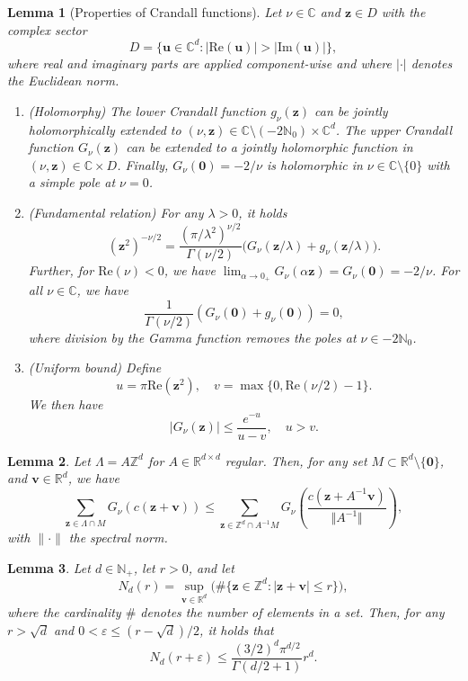 \documentclass[10pt,a4paper]{amsart}
\newtheorem{lemma}{Lemma}
\renewcommand{\Im}[1]{\mathrm{Im}(#1)}
\renewcommand{\Re}[1]{\mathrm{Re}(#1)}
\newcommand{\new}[1]{#1}
\begin{document}
\begin{lemma}[Properties of Crandall functions]
\label{lem:propCrandall}
Let $\nu \in\mathds C$ and $\bm z\in D$ with the complex sector
$$
D=\{\bm u\in\mathds C^d:|\Re{\bm u}|>|\Im{\bm u}|\},
$$
where real and imaginary parts are applied component-wise and where $\vert \bm \cdot \vert$ denotes the Euclidean norm.
\begin{enumerate}
\item (Holomorphy) The lower Crandall function $g_{\nu}(\bm z)$ 
\new{can be jointly holomorphically extended to} 
$(\nu,\bm z)\in\mathds C\setminus(-2\mathds N_0)\times \mathds C^d$. The upper Crandall function $G_{\nu}(\bm z)$ can be extended to a jointly holomorphic function in $(\nu,\bm z)\in \mathds C \times D$. Finally,
$G_{\nu}(\bm 0)=-2/\nu$ is holomorphic in $\nu\in\mathds C\setminus\{0\}$
with a simple pole at $\nu=0$.
\item (Fundamental relation)
For any $\lambda>0$, it holds
\[
( \bm z^2 )^{-\nu/2} = \frac{(\pi/\lambda^2 )^{\nu/2}}{\Gamma(\nu/2)} \Big(G_\nu(\bm z/\lambda)+g_\nu(\bm z/\lambda)\Big).
\]
Further, for $\mathrm{Re}(\nu)<0$, we have $\lim_{\alpha \to 0_+} G_\nu(\alpha\bm z)=G_\nu(\bm 0)=-2/\nu$. For all $\nu \in \mathds C$, we have
\[
\frac{1}{\Gamma(\nu/2)}(G_\nu(\bm 0)+g_\nu(\bm 0)) = 0,
\]
\new{where division by the Gamma function removes the poles at $\nu\in -2 \mathds N_0$.}
\item (Uniform bound)
Define
\[
u=\pi \mathrm{Re}(\bm z^2),\quad v=\max\{0,\mathrm{Re}(\nu/2)-1\}.\] 
We then have
$$
|G_\nu(\bm z)| \leq \frac{e^{-u}}{u-v}, \quad u>v.
$$
\end{enumerate}
\end{lemma}

\begin{lemma}
\label{lem:z-is-enough-revisited}
Let $\Lambda=A\mathds Z^d$ for $A\in\mathds R^{d\times d}$ regular.
Then, for any set $M\subset\mathds R^d\setminus\{\bm 0\}$,
and $\bm v\in\mathds R^d$, we have
\[\sum_{\bm z \in \Lambda \cap M} G_\nu(c(\bm z+\bm v)) \leq \sum_{\bm z \in \mathds{Z}^d \cap A^{-1}M} G_\nu\left(\frac{c(\bm z +A^{-1}\bm v)}{\Vert A^{-1}\Vert} \right),\]
with $\|\cdot\|$ the spectral norm.
\end{lemma}

\begin{lemma}
\label{lem:shells}
Let $d\in\mathds N_+$, let $r>0$, and let
$$
N_{d}(r)=\sup_{\bm v\in \mathds R^d}\big(\# 
\{\bm z\in\mathds Z^d: |\bm z+\bm v|\le r\}\big),
$$
where the cardinality $\#$ denotes the number of elements in a set. 
Then, for any $r>\sqrt{d}$ and $0<\varepsilon\le (r-\sqrt{d})/2$, it holds that
$$
N_d(r+\varepsilon) 
\le 
\frac{(3/2)^d\pi^{d/2}}{\Gamma(d/2+1)}r^d.
$$
\end{lemma}
\end{document}
